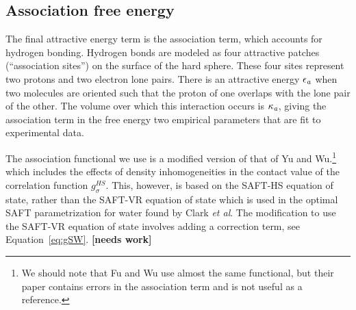 \documentclass[letterpaper,twocolumn,amsmath,amssymb,prb]{revtex4-1}
\newcommand{\red}[1]{{\bf \color{red} #1}}
\newcommand{\fixme}[1]{\red{[#1]}}
\begin{document}
\subsection{Association free energy}
The final attractive energy term is the association term, which
accounts for hydrogen bonding.  Hydrogen bonds are modeled as four
attractive patches (``association sites'') on the surface of the hard
sphere.  These four sites represent two protons and two electron lone
pairs.  There is an attractive energy $\epsilon_\textit{a}$ when
two molecules are oriented such that the proton of one overlaps
with the lone pair of the other.  The volume over which this
interaction occurs is $\kappa_\textit{a}$, giving the association
term in the free energy two empirical parameters that are fit to
experimental data.

The association functional we use is a modified version of that of Yu
and Wu\cite{yu2002fmt-dft-inhomogeneous-associating}.\footnote{We
  should note that Fu and Wu\cite{fu2005vapor-liquid-dft} use almost
  the same functional, but their paper contains errors in the
  association term and is not useful as a reference.} 
which includes the effects of density inhomogeneities in the
contact value of the correlation function $g^{HS}_\sigma$. This, however, is
based on the SAFT-HS equation of state, rather than the SAFT-VR
equation of state\cite{gil-villegas-1997-SAFT-VR} which is used in the
optimal SAFT parametrization for water found by Clark \emph{et
  al}\cite{clark2006developing}.  The modification to use the SAFT-VR
equation of state involves adding a correction term, see
Equation~\ref{eq:gSW}.  \fixme{needs work}
\end{document}
